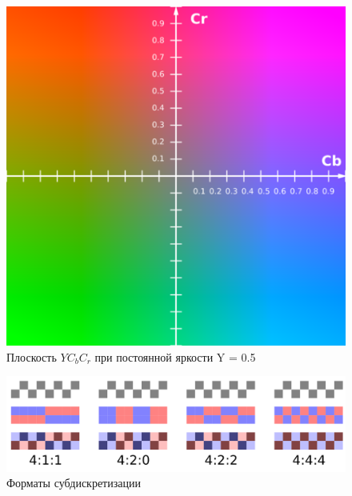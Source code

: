 \begin{figure}[H]
	\begin{center}
		\includegraphics[scale=0.5]{../pics/YCbCr/YCbCr.png}
		\caption{Плоскость $YC_bC_r$ при постоянной яркости Y = 0.5} 
		\label{pic:YCbCr:separation}
	\end{center}
\end{figure}

\begin{figure}[H]
	\begin{center}
		\includegraphics[scale=0.35]{../pics/chroma_subsampling/chroma_subsampling_ratios.png}
		\caption{Форматы субдискретизации} 
		\label{pic:chroma_subsampling}
	\end{center}
\end{figure}

